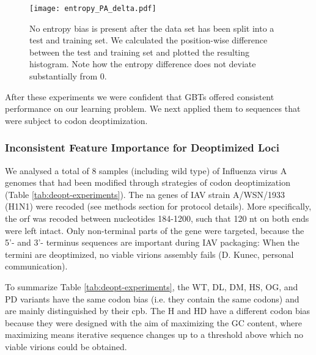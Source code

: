 \begin{figure}[H]
    \begin{center}\texttt{[image: entropy\_PA\_delta.pdf]}\end{center}
    \caption[No entropy bias in test-train split.]{No entropy bias is present after the data set has been split into a test and training set. We calculated the position-wise difference between the test and training set and plotted the resulting histogram. Note how the entropy difference does not deviate substantially from 0.}
    \label{fig:delta}
\end{figure}


After these experiments we were confident that GBTs offered consistent performance on our learning problem. We next applied them to sequences that were subject to codon deoptimization.


\subsubsection{Inconsistent Feature Importance for Deoptimized Loci}

We analysed a total of 8 samples (including wild type) of Influenza virus A genomes that had been modified through strategies of codon deoptimization (Table \ref{tab:deopt-experiments}). The \gls{na} genes of IAV strain A/WSN/1933 (H1N1) were recoded (see methods section for protocol details). More specifically, the \gls{orf} was recoded between nucleotides 184-1200, such that 120 nt on both ends were left intact. Only non-terminal parts of the gene were targeted, because the 5'- and 3'- terminus sequences are important during IAV packaging: When the termini are deoptimized, no viable virions assembly fails (D. Kunec, personal communication).

To summarize Table \ref{tab:deopt-experiments}, the WT, DL, DM, HS, OG, and PD variants have the same codon bias (i.e. they contain the same codons) and are mainly distinguished by their \gls{cpb}. The H and HD have a different codon bias because they were designed with the aim of maximizing the GC content, where maximizing means iterative sequence changes up to a threshold above which no viable virions could be obtained.


